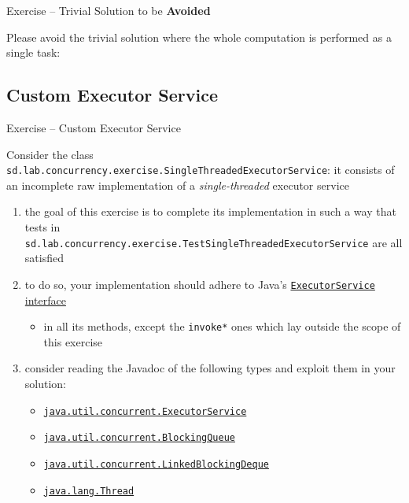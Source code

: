 \documentclass[presentation]{beamer}\mode<presentation>{\usetheme{AMSBolognaFC}}
\begin{document}
\begin{frame}[c,allowframebreaks]{Exercise \currentExercise{} -- Trivial Solution to be \textbf{Avoided}}

	Please \alert{avoid} the trivial solution where the whole computation is performed as a single task:
	

\end{frame}

\startExercise

\subsection{Custom Executor Service}

\begin{frame}[c,allowframebreaks]{Exercise \currentExercise{} -- Custom Executor Service}

	Consider the class \texttt{sd.lab.concurrency.exercise.\alert{SingleThreadedExecutorService}}: it consists of an \alert{incomplete} raw implementation of a \emph{single-threaded} executor service
	\bigskip
	\begin{enumerate}
		\item the goal of this exercise is to complete its implementation in such a way that tests in \texttt{sd.lab\allowbreak{}.concurrency\allowbreak{}.exercise\allowbreak{}.\alert{TestSingleThreadedExecutorService}}
		are all satisfied

		\bigskip

		\item to do so, your implementation should adhere to Java's \href{https://docs.oracle.com/javase/8/docs/api/java/util/concurrent/ExecutorService.html}{\texttt{ExecutorService} interface}
		\begin{itemize}
			\item in all its methods, except the \texttt{invoke*} ones which lay outside the scope of this exercise
		\end{itemize}

		\bigskip

		\item consider reading the Javadoc of the following types and exploit them in your solution:
		\begin{itemize}
			\item \href{https://docs.oracle.com/javase/8/docs/api/java/util/concurrent/ExecutorService.html}{\texttt{java.util.concurrent.ExecutorService}}
			\item \href{https://docs.oracle.com/javase/8/docs/api/java/util/concurrent/BlockingQueue.html}{\texttt{java.util.concurrent.BlockingQueue}}
			\item \href{https://docs.oracle.com/javase/8/docs/api/java/util/concurrent/LinkedBlockingDeque.html}{\texttt{java.util.concurrent.LinkedBlockingDeque}}
			\item \href{https://docs.oracle.com/javase/8/docs/api/java/lang/Thread.html}{\texttt{java.lang.Thread}}
		\end{itemize}


\end{enumerate}
\end{frame}
\end{document}
